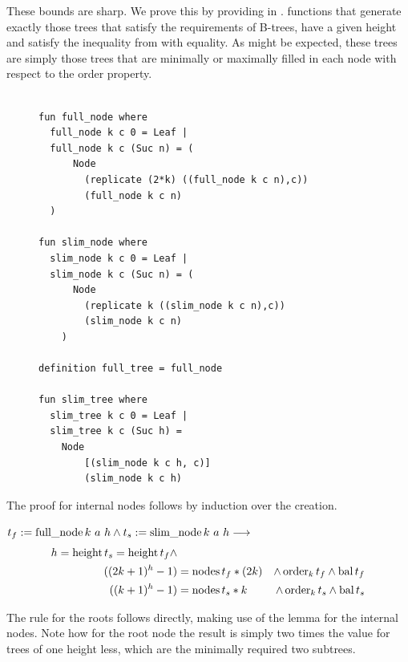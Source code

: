 These bounds are sharp.
We prove this by providing in .
functions that generate exactly those trees
that satisfy the requirements of B-trees, have a given height
and satisfy the inequality from 
with equality.
As might be expected, these trees are simply those trees
that are minimally or maximally filled in each node with respect
to the order property.

\begin{figure}
\begin{lstlisting}[mathescape=true, language=Isabelle,label={lst:sharp-trees-def},
    caption={The functions generating trees with minimal size and maximal size for given height.}]

fun full_node where
  full_node k c 0 = Leaf |
  full_node k c (Suc n) = (
      Node
        (replicate (2*k) ((full_node k c n),c))
        (full_node k c n)
  )

fun slim_node where
  slim_node k c 0 = Leaf |
  slim_node k c (Suc n) = (
      Node
        (replicate k ((slim_node k c n),c))
        (slim_node k c n)
    )

definition full_tree = full_node

fun slim_tree where
  slim_tree k c 0 = Leaf |
  slim_tree k c (Suc h) =
    Node
        [(slim_node k c h, c)]
        (slim_node k c h)

\end{lstlisting}
\end{figure}

The proof for internal nodes follows by induction over the creation.

\begin{lemma} $t_f := \operatorname{full\_node} k\ a\ h \wedge t_s := \operatorname{slim\_node} k\ a\ h \longrightarrow$
    \begin{align}
    h = \operatorname{height} t_s = \operatorname{height} t_f \wedge \\
    ((2k+1)^h - 1) &= \operatorname{nodes} t_f * (2k) &\wedge \operatorname{order}_k t_f \wedge \operatorname{bal} t_f \\ 
    ((k+1)^h - 1) &= \operatorname{nodes} t_s * k  &\wedge \operatorname{order}_k t_s \wedge \operatorname{bal} t_s
    \end{align}
\end{lemma}

The rule for the roots follows directly, making use of the lemma
for the internal nodes.
Note how for the root node the result is simply two times the
value for trees of one height less, which are the minimally
required two subtrees.

